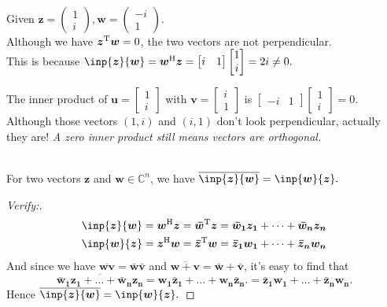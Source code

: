 \begin{example}\qquad\\
Given $\bm z=\begin{pmatrix}
1\\i
\end{pmatrix}, \bm w=\begin{pmatrix}
-i\\1
\end{pmatrix}$.\\
Although we have $\bm z^{\mathrm T}\bm w=0$, the two vectors are not perpendicular.\\ This is because $\inp{\bm z}{\bm w}=\bm w\Her\bm z=\begin{bmatrix}
i&1
\end{bmatrix}\begin{bmatrix}
1\\i
\end{bmatrix}=2i\ne0.$
\end{example}
\begin{example}
The inner product of $\bm u=\begin{bmatrix}
1\\i
\end{bmatrix}$ with $\bm v=\begin{bmatrix}
i\\1
\end{bmatrix}$ is $\begin{bmatrix}
-i&1
\end{bmatrix}\begin{bmatrix}
1\\i
\end{bmatrix}=0.$\\
Although those vectors $(1,i)$ and $(i,1)$ don't look perpendicular, actually they are! \emph{A zero inner product still means vectors are orthogonal.}
\end{example}
\begin{proposition}\qquad\\
For two vectors $\bm z$ and $\bm w\in\mathbb{C}^{n}$, we have $\overline{\inp{\bm z}{\bm w}}=\inp{\bm w}{\bm z}.$
\end{proposition}
\begin{proof}[Verify:]
\begin{gather*}
\inp{\bm z}{\bm w}=\bm w\Her\bm z=\bm{\bar w}\trans\bm z
=\bm{\bar w_1}\bm{z_1}+\dots+\bm{\bar w_n}\bm{z_n}
\\
\inp{\bm w}{\bm z}=\bm z\Her\bm w=\bm{\bar z}\trans\bm w
=\bm{\bar z_1}\bm{w_1}+\dots+\bm{\bar z_n}\bm{w_n}
\end{gather*}
And since we have $\overline{\bm w\bm v}=\bm{\bar w}\bm{\bar v}$ and $\overline{\bm w+\bm v}=\bm{\bar w}+\bm{\bar v}$, it's easy to find that
\[
\overline{\bm{\bar w_1}\bm{z_1}+\dots+\bm{\bar w_n}\bm{z_n}}
=\bm{w_1}\bm{\bar z_1}+\dots+\bm{w_n}\bm{\bar z_n}.
=\bm{\bar z_1}\bm{w_1}+\dots+\bm{\bar z_n}\bm{w_n}.
\]
Hence $\overline{\inp{\bm z}{\bm w}}=\inp{\bm w}{\bm z}.$
\end{proof}
